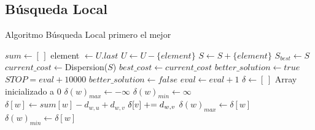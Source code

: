 \subsection{Búsqueda Local}
\begin{algorithm}[H]
\caption{Algoritmo Búsqueda Local primero el mejor}
\begin{algorithmic}[1]
    \State $sum \gets [ \, ]$
    \State
        \State element $\gets U.last$
        \State $U \gets U - \{element\}$
        \State $S \gets S + \{element\}$
    \EndFor
    \State
    \State $S_{best} \gets S$
    \State $current\_cost \gets $Dispersion($S$)
    \State $best\_cost \gets current\_cost$
    \State
    \State $better\_solution \gets true$
    \State $STOP = eval + 10000$
    \State
        \State $better\_solution \gets false$
        \State
                \State $eval \gets eval+1$
                \State $\delta \gets [\,]$ \Comment Array inicializado a 0
                \State $\delta(w)_{max} \gets -\infty$
                \State $\delta(w)_{min} \gets \infty$
                \State
                        \State $\delta[w] \gets sum[w] - d_{w,u} + d_{w,v}$
                        \State $\delta[v] \mathrel{+}= d_{w,v}$
                        \State
                            \State $\delta(w)_{max} \gets \delta[w]$
                        \EndIf
                            \State $\delta(w)_{min} \gets \delta[w]$
                        \EndIf
                    \EndIf
                \EndFor
    \end{algorithmic}
    \end{algorithm}

